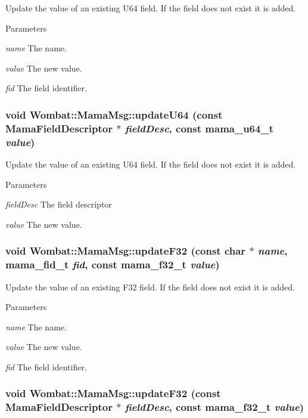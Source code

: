 Update the value of an existing U64 field. If the field does not exist it is added.


\begin{DoxyParams}{Parameters}
\item[{\em name}]The name. \item[{\em value}]The new value. \item[{\em fid}]The field identifier. \end{DoxyParams}
\hypertarget{classWombat_1_1MamaMsg_a44733b4753b2f76e3f97f780ce13c8c0}{
\subsubsection[{updateU64}]{\setlength{\rightskip}{0pt plus 5cm}void Wombat::MamaMsg::updateU64 (const {\bf MamaFieldDescriptor} $\ast$ {\em fieldDesc}, \/  const mama\_\-u64\_\-t {\em value})}}
\label{classWombat_1_1MamaMsg_a44733b4753b2f76e3f97f780ce13c8c0}


Update the value of an existing U64 field. If the field does not exist it is added.


\begin{DoxyParams}{Parameters}
\item[{\em fieldDesc}]The field descriptor \item[{\em value}]The new value. \end{DoxyParams}
\hypertarget{classWombat_1_1MamaMsg_a7882d6c3c0cd29d2c266f7a9e99725fb}{
\subsubsection[{updateF32}]{\setlength{\rightskip}{0pt plus 5cm}void Wombat::MamaMsg::updateF32 (const char $\ast$ {\em name}, \/  mama\_\-fid\_\-t {\em fid}, \/  const mama\_\-f32\_\-t {\em value})}}
\label{classWombat_1_1MamaMsg_a7882d6c3c0cd29d2c266f7a9e99725fb}


Update the value of an existing F32 field. If the field does not exist it is added.


\begin{DoxyParams}{Parameters}
\item[{\em name}]The name. \item[{\em value}]The new value. \item[{\em fid}]The field identifier. \end{DoxyParams}
\hypertarget{classWombat_1_1MamaMsg_a609b8da1c0708e8c7e1b3097856c71a4}{
\subsubsection[{updateF32}]{\setlength{\rightskip}{0pt plus 5cm}void Wombat::MamaMsg::updateF32 (const {\bf MamaFieldDescriptor} $\ast$ {\em fieldDesc}, \/  const mama\_\-f32\_\-t {\em value})}}
\label{classWombat_1_1MamaMsg_a609b8da1c0708e8c7e1b3097856c71a4}


